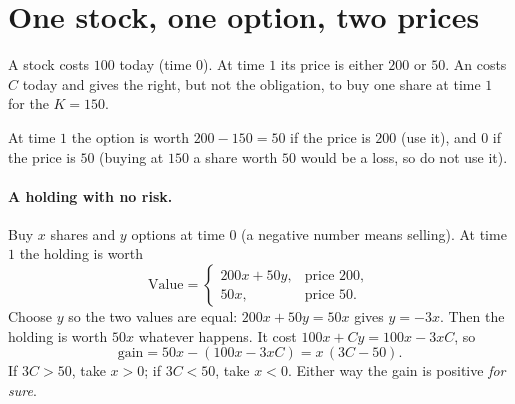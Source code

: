 \section{One stock, one option, two prices}

\begin{setup}
A stock costs $100$ today (time $0$). At time $1$ its price is either $200$ or $50$. An  costs $C$ today and gives the right, but not the obligation, to buy one share at time $1$ for the  $K=150$.
\end{setup}

At time $1$ the option is worth $200-150=50$ if the price is $200$ (use it), and $0$ if the price is $50$ (buying at $150$ a share worth $50$ would be a loss, so do not use it).

\begin{pic}
\end{pic}

\paragraph{A holding with no risk.} Buy $x$ shares and $y$ options at time $0$ (a negative number means selling). At time $1$ the holding is worth
\[
  \text{Value}=\begin{cases}200x+50y,&\text{price }200,\\ 50x,&\text{price }50.\end{cases}
\]
Choose $y$ so the two values are equal: $200x+50y=50x$ gives $y=-3x$. Then the holding is worth $50x$ whatever happens. It cost $100x+Cy=100x-3xC$, so
\[
  \text{gain}=50x-(100x-3xC)=x\,(3C-50).
\]
If $3C>50$, take $x>0$; if $3C<50$, take $x<0$. Either way the gain is positive \emph{for sure}.

